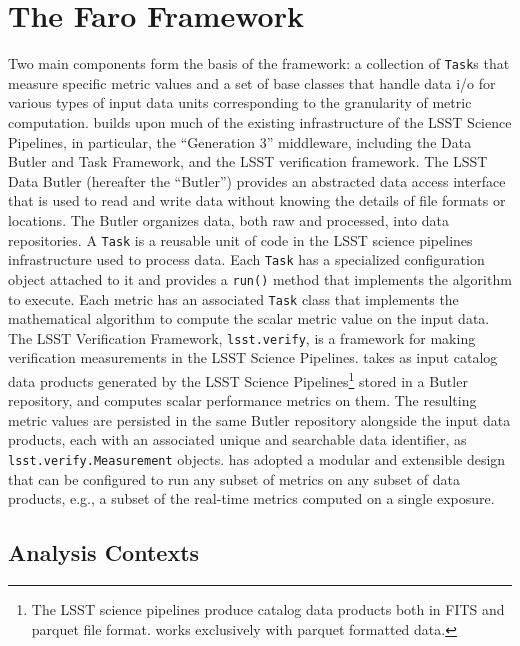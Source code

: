 \section{The Faro Framework} \label{sec:faro}

Two main components form the basis of the \faro framework: a collection of \texttt{Task}s that measure specific metric values and a set of base classes that handle data i/o for various types of input data units corresponding to the granularity of metric computation.
\faro builds upon much of the existing infrastructure of the LSST Science Pipelines, in particular, the ``Generation 3'' middleware, including the Data Butler and Task Framework\cite{SPIE-12189-40}, and the LSST verification framework\cite{DMTN-098}.
The LSST Data Butler (hereafter the ``Butler'') provides an abstracted data access interface that is used to read and write data without knowing the details of file formats or locations.
The Butler organizes data, both raw and processed, into data repositories.
A \texttt{Task} is a reusable unit of code in the LSST science pipelines infrastructure used to process data.
Each \texttt{Task} has a specialized configuration object attached to it and provides a \texttt{run()} method that implements the algorithm to execute. 
Each \faro metric has an associated \texttt{Task} class that implements the mathematical algorithm to compute the scalar metric value on the input data.
The LSST Verification Framework, \texttt{lsst.verify}, is a framework for making verification measurements in the LSST Science Pipelines.
\faro takes as input catalog data products generated by the LSST Science Pipelines\footnote{The LSST science pipelines produce catalog data products both in FITS and parquet file format. \faro works exclusively with parquet formatted data.} stored in a Butler repository,
 and computes scalar performance metrics on them. 
The resulting metric values are persisted in the same Butler repository alongside the input data products, each with an associated unique and searchable data identifier,
as \texttt{lsst.verify.Measurement} objects.
\faro has adopted a modular and extensible design that can be configured to run any subset of metrics on any subset of data products, e.g., a subset of the real-time metrics computed on a single exposure.

\subsection{Analysis Contexts} \label{ssec:analysis_context}

